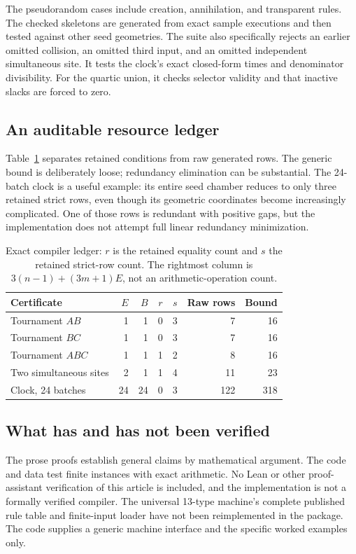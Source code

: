 \documentclass[11pt,letterpaper]{article}
\numberwithin{equation}{section}
\theoremstyle{definition}
\theoremstyle{remark}
\begin{document}
The pseudorandom cases include creation, annihilation, and transparent rules.
The checked skeletons are generated from exact sample executions and then
tested against other seed geometries. The suite also specifically rejects
an earlier omitted collision, an omitted third input, and an omitted
independent simultaneous site. It tests the clock's exact closed-form times
and denominator divisibility. For the quartic union, it checks selector
validity and that inactive slacks are forced to zero.

\subsection{An auditable resource ledger}

Table~\ref{smc:cg:tab:ledger} separates retained conditions from raw generated rows.
The generic bound is deliberately loose; redundancy elimination can be
substantial. The 24-batch clock is a useful example: its entire seed chamber
reduces to only three retained strict rows, even though its geometric
coordinates become increasingly complicated. One of those rows is redundant
with positive gaps, but the implementation does not attempt full linear
redundancy minimization.

\begin{table}[htbp]
\centering
\small
\begin{tabular}{lrrrrrr}
\toprule
Certificate & $E$ & $B$ & $r$ & $s$ & Raw rows & Bound\\
\midrule
Tournament $AB$ & 1&1&0&3&7&16\\
Tournament $BC$ & 1&1&0&3&7&16\\
Tournament $ABC$ & 1&1&1&2&8&16\\
Two simultaneous sites & 2&1&1&4&11&23\\
Clock, 24 batches & 24&24&0&3&122&318\\
\bottomrule
\end{tabular}
\caption{Exact compiler ledger: $r$ is the retained equality count and $s$
the retained strict-row count. The rightmost column is
$3(n-1)+(3m+1)E$, not an arithmetic-operation count.}
\label{smc:cg:tab:ledger}
\end{table}

\subsection{What has and has not been verified}

The prose proofs establish general claims by mathematical argument. The
code and data test finite instances with exact arithmetic. No Lean or other
proof-assistant verification of this article is included, and the
implementation is not a formally verified compiler. The universal 13-type
machine's complete published rule table and finite-input loader have not
been reimplemented in the package. The code supplies a generic machine
interface and the specific worked examples only.
\end{document}
